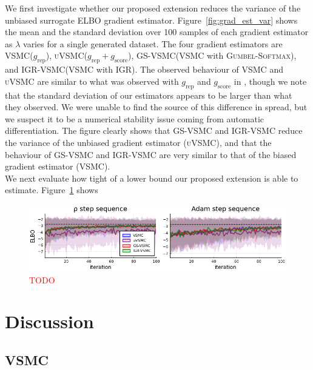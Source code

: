 \documentclass[12pt]{article}
\newcommand{\todo}{\textcolor{red}{TODO}}
\newcommand{\vsmc}{\textsc{VSMC}\xspace}
\newcommand{\uvsmc}{\textsc{uVSMC}\xspace}
\newcommand{\gsvsmc}{\textsc{GS-VSMC}\xspace}
\newcommand{\igrvsmc}{\textsc{IGR-VSMC}\xspace}
\newcommand{\elbo}{\textsc{ELBO}\xspace}
\newcommand{\grep}{g_{\mathrm{rep}}}
\newcommand{\gscore}{g_{\mathrm{score}}}
\newcommand{\gumbelsoftmax}{\textsc{Gumbel-Softmax}\xspace}
\newcommand{\igr}{\textsc{IGR}\xspace}
\begin{document}
We first investigate whether our proposed extension reduces the variance of the unbiased surrogate \elbo gradient estimator. Figure~\ref{fig:grad_est_var} shows the mean and the standard deviation over 100 samples of each gradient estimator as $\lambda$ varies for a single generated dataset. The four gradient estimators are \vsmc ($\grep$), \uvsmc ($\grep+\gscore$), \gsvsmc (\vsmc with \gumbelsoftmax), and \igrvsmc (\vsmc with \igr). The observed behaviour of \vsmc and \uvsmc are similar to what was observed with $\grep$ and $\gscore$ in \parencite{Naesseth:2018}, though we note that the standard deviation of our estimators appears to be larger than what they observed. We were unable to find the source of this difference in spread, but we suspect it to be a numerical stability issue coming from automatic differentiation. The figure clearly shows that \gsvsmc and \igrvsmc reduce the variance of the unbiased gradient estimator (\uvsmc), and that the behaviour of \gsvsmc and \igrvsmc are very similar to that of the biased gradient estimator (\vsmc).
\\

We next evaluate how tight of a lower bound our proposed extension is able to estimate. Figure~\ref{fig:slgss_elbo} shows

\begin{figure}[t]
\centering
\includegraphics[width=\textwidth]{figures/slgss_elbo.png}
\caption{\todo}
\label{fig:slgss_elbo}
\end{figure}


\section{Discussion}\label{sec:discussion}

\newpage

\subsection{VSMC}
\end{document}
